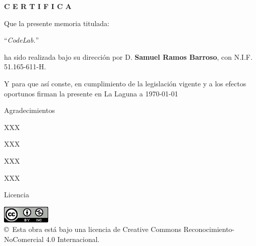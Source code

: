 \documentclass[spanish,a4paper,14pt,oneside]{extreport}
\begin{document}
\bigskip
\bigskip
{\bf C E R T I F I C A}

\bigskip
\bigskip
\bigskip
Que la presente memoria titulada:

\bigskip
``{\it CodeLab.}''

\bigskip
\bigskip
\bigskip

\noindent ha sido realizada bajo su dirección por D. {\bf Samuel Ramos Barroso},
con N.I.F. 51.165-611-H.

\bigskip
\bigskip

Y para que así conste, en cumplimiento de la legislación vigente y a los efectos oportunos firman la presente en La Laguna a \today

\newpage
\thispagestyle{empty}

{ \flushright

\begin{LARGE}
Agradecimientos
\end{LARGE}

\hspace{3mm}

\begin{large}


\hspace{3mm}
XXX

\hspace{3mm}
XXX


\hspace{3mm}
XXX


\hspace{3mm}
XXX


\end{large}

}

\newpage

\begin{huge}
Licencia
\end{huge}

\begin{center}
\includegraphics[scale=1.5]{images/by-nc_88x31}\\[10mm]
{\Large \copyright~Esta obra está bajo una licencia de Creative Commons Reconocimiento-NoComercial 4.0 Internacional.
}
\end{center}
\end{document}
